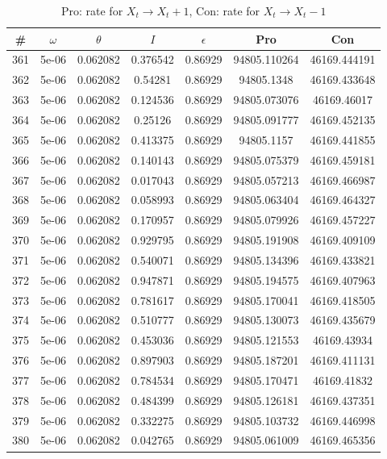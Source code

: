 \newpage
\begin{table}
\caption{Pro: rate for $X_t \rightarrow X_t + 1$, Con: rate for $X_t \rightarrow X_t - 1$}
\begin{tabular*}{\linewidth}{c|c|c|c|c|c|c}
\# & $\omega$ & $\theta$ & $I$ & $\epsilon$ & Pro & Con \\
\hline
361 & 5e-06 & 0.062082 & 0.376542 & 0.86929 & 94805.110264 & 46169.444191\\
362 & 5e-06 & 0.062082 & 0.54281 & 0.86929 & 94805.1348 & 46169.433648\\
363 & 5e-06 & 0.062082 & 0.124536 & 0.86929 & 94805.073076 & 46169.46017\\
364 & 5e-06 & 0.062082 & 0.25126 & 0.86929 & 94805.091777 & 46169.452135\\
365 & 5e-06 & 0.062082 & 0.413375 & 0.86929 & 94805.1157 & 46169.441855\\
366 & 5e-06 & 0.062082 & 0.140143 & 0.86929 & 94805.075379 & 46169.459181\\
367 & 5e-06 & 0.062082 & 0.017043 & 0.86929 & 94805.057213 & 46169.466987\\
368 & 5e-06 & 0.062082 & 0.058993 & 0.86929 & 94805.063404 & 46169.464327\\
369 & 5e-06 & 0.062082 & 0.170957 & 0.86929 & 94805.079926 & 46169.457227\\
370 & 5e-06 & 0.062082 & 0.929795 & 0.86929 & 94805.191908 & 46169.409109\\
371 & 5e-06 & 0.062082 & 0.540071 & 0.86929 & 94805.134396 & 46169.433821\\
372 & 5e-06 & 0.062082 & 0.947871 & 0.86929 & 94805.194575 & 46169.407963\\
373 & 5e-06 & 0.062082 & 0.781617 & 0.86929 & 94805.170041 & 46169.418505\\
374 & 5e-06 & 0.062082 & 0.510777 & 0.86929 & 94805.130073 & 46169.435679\\
375 & 5e-06 & 0.062082 & 0.453036 & 0.86929 & 94805.121553 & 46169.43934\\
376 & 5e-06 & 0.062082 & 0.897903 & 0.86929 & 94805.187201 & 46169.411131\\
377 & 5e-06 & 0.062082 & 0.784534 & 0.86929 & 94805.170471 & 46169.41832\\
378 & 5e-06 & 0.062082 & 0.484399 & 0.86929 & 94805.126181 & 46169.437351\\
379 & 5e-06 & 0.062082 & 0.332275 & 0.86929 & 94805.103732 & 46169.446998\\
380 & 5e-06 & 0.062082 & 0.042765 & 0.86929 & 94805.061009 & 46169.465356\\

\end{tabular*}
\end{table}
